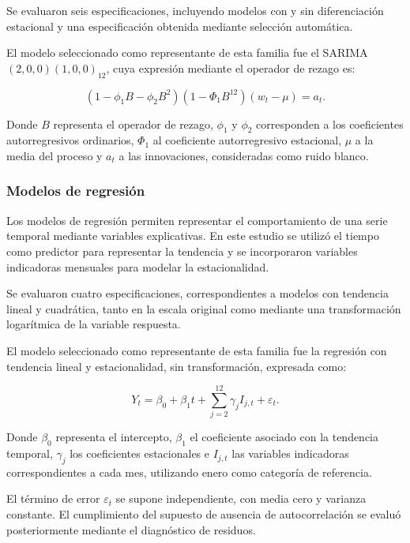 \documentclass[12pt]{article}
\begin{document}
Se evaluaron seis especificaciones, incluyendo 
modelos con y sin diferenciación estacional y una 
especificación obtenida mediante selección automática.

El modelo seleccionado como representante de esta 
familia fue el SARIMA$(2,0,0)(1,0,0)_{12}$, cuya 
expresión mediante el operador de rezago es:

\begin{equation}
(1-\phi_1B-\phi_2B^2)
(1-\Phi_1B^{12})(w_t-\mu)=a_t.
\label{eq:sarima}
\end{equation}

Donde $B$ representa el operador de rezago, $\phi_1$ 
y $\phi_2$ corresponden a los coeficientes 
autorregresivos ordinarios, $\Phi_1$ al coeficiente 
autorregresivo estacional, $\mu$ a la media del 
proceso y $a_t$ a las innovaciones, consideradas 
como ruido blanco.

\subsubsection{Modelos de regresión}

Los modelos de regresión permiten representar el 
comportamiento de una serie temporal mediante 
variables explicativas. En este estudio se utilizó 
el tiempo como predictor para representar la tendencia 
y se incorporaron variables indicadoras mensuales 
para modelar la estacionalidad.

Se evaluaron cuatro especificaciones, correspondientes 
a modelos con tendencia lineal y cuadrática, tanto 
en la escala original como mediante una transformación 
logarítmica de la variable respuesta.

El modelo seleccionado como representante de esta 
familia fue la regresión con tendencia lineal y 
estacionalidad, sin transformación, expresada como:

\begin{equation}
Y_t=\beta_0+\beta_1t+
\sum_{j=2}^{12}\gamma_j I_{j,t}+\varepsilon_t.
\label{eq:regresion}
\end{equation}

Donde $\beta_0$ representa el intercepto, $\beta_1$ 
el coeficiente asociado con la tendencia temporal, 
$\gamma_j$ los coeficientes estacionales e $I_{j,t}$ 
las variables indicadoras correspondientes a cada 
mes, utilizando enero como categoría de referencia.

El término de error $\varepsilon_t$ se supone 
independiente, con media cero y varianza constante. 
El cumplimiento del supuesto de ausencia de 
autocorrelación se evaluó posteriormente mediante 
el diagnóstico de residuos.
\end{document}
